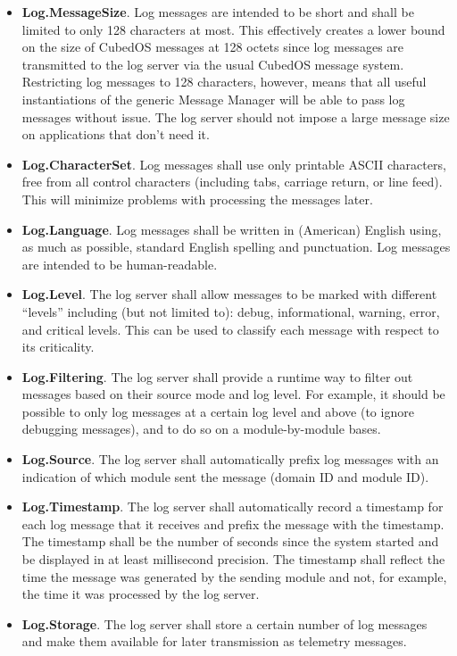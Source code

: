\begin{itemize}
  \item \textbf{Log.MessageSize}. Log messages are intended to be short and shall be limited to
    only 128 characters at most. This effectively creates a lower bound on the size of CubedOS
    messages at 128 octets since log messages are transmitted to the log server via the usual
    CubedOS message system. Restricting log messages to 128 characters, however, means that all
    useful instantiations of the generic Message Manager will be able to pass log messages
    without issue. The log server should not impose a large message size on applications that
    don't need it.
  \item \textbf{Log.CharacterSet}. Log messages shall use only printable ASCII characters, free
    from all control characters (including tabs, carriage return, or line feed). This will
    minimize problems with processing the messages later.
  \item \textbf{Log.Language}. Log messages shall be written in (American) English using, as
    much as possible, standard English spelling and punctuation. Log messages are intended to be
    human-readable.
  \item \textbf{Log.Level}. The log server shall allow messages to be marked with different
    ``levels'' including (but not limited to): debug, informational, warning, error, and
    critical levels. This can be used to classify each message with respect to its criticality.
  \item \textbf{Log.Filtering}. The log server shall provide a runtime way to filter out
    messages based on their source mode and log level. For example, it should be possible to
    only log messages at a certain log level and above (to ignore debugging messages), and to do
    so on a module-by-module bases. 
  \item \textbf{Log.Source}. The log server shall automatically prefix log messages with an
    indication of which module sent the message (domain ID and module ID).
  \item \textbf{Log.Timestamp}. The log server shall automatically record a timestamp for each
    log message that it receives and prefix the message with the timestamp. The timestamp shall
    be the number of seconds since the system started and be displayed in at least millisecond
    precision. The timestamp shall reflect the time the message was generated by the sending
    module and not, for example, the time it was processed by the log server.
  \item \textbf{Log.Storage}. The log server shall store a certain number of log messages and
    make them available for later transmission as telemetry messages. 
\end{itemize}

